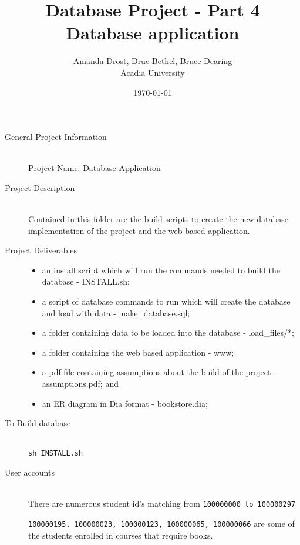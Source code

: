 \documentclass{article}
\begin{document}
\title{\huge{Database Project - Part 4 Database application}}
    \author{Amanda Drost, Drue Bethel, Bruce Dearing\\
    Acadia University}
\date{\today}
\maketitle
\clearpage

\begin{description}

    \item[General Project Information] \hfill \\
        Project Name: Database Application \\


    \item[Project Description] \hfill \\
        Contained in this folder are the build scripts to create the \underline{new} database implementation of the project and the web based application. 

    
    \item[Project Deliverables] \hfill 
        \begin{itemize}
            \item an install script which will run the commands needed to build the database - INSTALL.sh;
            \item a script of database commands to run which will create the database and load with data - make_database.sql;
            \item a folder containing data to be loaded into the database - load_files/*;
            \item a folder containing the web based application - www;
            \item a pdf file containing assumptions about the build of the project - assumptions.pdf; and
            \item an ER diagram in Dia format - bookstore.dia;
        \end{itemize}
        
    \item[To Build database] \hfill \\
		\texttt{sh INSTALL.sh}
	
	\item[User accounts] \hfill \\
		There are numerous student id's matching from 
		\verb|100000000 to 100000297| 
		
		
		\verb|100000195, 100000023, 100000123, 100000065, 100000066| are
		some of the students enrolled in courses that require books.
		

\end{description}
\end{document}
